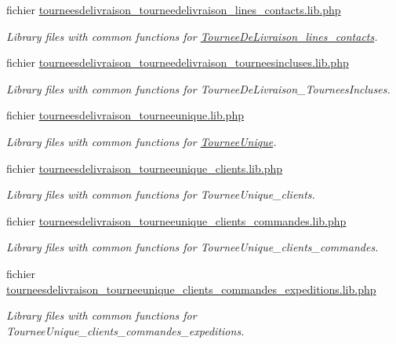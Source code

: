 \begin{DoxyCompactItemize}
fichier \hyperlink{tourneesdelivraison__tourneedelivraison__lines__contacts_8lib_8php}{tourneesdelivraison\+\_\+tourneedelivraison\+\_\+lines\+\_\+contacts.\+lib.\+php}
\begin{DoxyCompactList}\small\item\em Library files with common functions for \hyperlink{classTourneeDeLivraison__lines__contacts}{Tournee\+De\+Livraison\+\_\+lines\+\_\+contacts}. \end{DoxyCompactList}\item 
fichier \hyperlink{tourneesdelivraison__tourneedelivraison__tourneesincluses_8lib_8php}{tourneesdelivraison\+\_\+tourneedelivraison\+\_\+tourneesincluses.\+lib.\+php}
\begin{DoxyCompactList}\small\item\em Library files with common functions for Tournee\+De\+Livraison\+\_\+\+Tournees\+Incluses. \end{DoxyCompactList}\item 
fichier \hyperlink{tourneesdelivraison__tourneeunique_8lib_8php}{tourneesdelivraison\+\_\+tourneeunique.\+lib.\+php}
\begin{DoxyCompactList}\small\item\em Library files with common functions for \hyperlink{classTourneeUnique}{Tournee\+Unique}. \end{DoxyCompactList}\item 
fichier \hyperlink{tourneesdelivraison__tourneeunique__clients_8lib_8php}{tourneesdelivraison\+\_\+tourneeunique\+\_\+clients.\+lib.\+php}
\begin{DoxyCompactList}\small\item\em Library files with common functions for Tournee\+Unique\+\_\+clients. \end{DoxyCompactList}\item 
fichier \hyperlink{tourneesdelivraison__tourneeunique__clients__commandes_8lib_8php}{tourneesdelivraison\+\_\+tourneeunique\+\_\+clients\+\_\+commandes.\+lib.\+php}
\begin{DoxyCompactList}\small\item\em Library files with common functions for Tournee\+Unique\+\_\+clients\+\_\+commandes. \end{DoxyCompactList}\item 
fichier \hyperlink{tourneesdelivraison__tourneeunique__clients__commandes__expeditions_8lib_8php}{tourneesdelivraison\+\_\+tourneeunique\+\_\+clients\+\_\+commandes\+\_\+expeditions.\+lib.\+php}
\begin{DoxyCompactList}\small\item\em Library files with common functions for Tournee\+Unique\+\_\+clients\+\_\+commandes\+\_\+expeditions. \end{DoxyCompactList}\item 

\end{DoxyCompactItemize}
